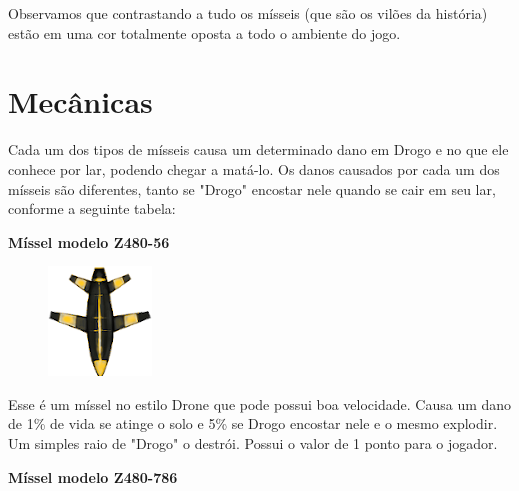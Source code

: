 \documentclass[a4paper,11pt]{article}
\begin{document}
Observamos que contrastando a tudo os mísseis (que são os vilões da história) estão em uma cor totalmente oposta a todo o ambiente do jogo.

\section{Mecânicas}
Cada um dos tipos de mísseis causa um determinado dano em Drogo e no que ele conhece por lar, podendo chegar a matá-lo. Os danos causados por cada um dos mísseis são diferentes, tanto se "Drogo" encostar nele quando se cair em seu lar, conforme a seguinte tabela:

\textbf{Míssel modelo Z480-56}

\begin{minipage}{\textwidth}
	\begin{figure}
		\vspace{-\baselineskip}
		\includegraphics[width=0.8\linewidth]{imagens/pi-Misseis1.png} 
	\end{figure}
	Esse é um míssel no estilo Drone que pode possui boa velocidade. Causa um dano de 1\% de vida se atinge o solo e 5\% se Drogo encostar nele e o mesmo explodir. Um simples raio de "Drogo" o destrói. Possui o valor de 1 ponto para o jogador.
	\vspace{10pt}
\end{minipage}

\textbf{Míssel modelo Z480-786}
\end{document}
